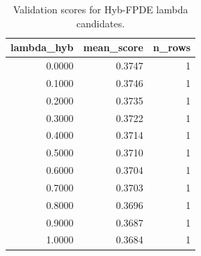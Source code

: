 \begin{table}[t]
\caption{Validation scores for Hyb-FPDE lambda candidates.}
\label{tab:lambda_distribution_computed}
\centering
\begin{tabular}{rrr}
\toprule
lambda\_hyb & mean\_score & n\_rows \\
\midrule
0.0000 & 0.3747 & 1 \\
0.1000 & 0.3746 & 1 \\
0.2000 & 0.3735 & 1 \\
0.3000 & 0.3722 & 1 \\
0.4000 & 0.3714 & 1 \\
0.5000 & 0.3710 & 1 \\
0.6000 & 0.3704 & 1 \\
0.7000 & 0.3703 & 1 \\
0.8000 & 0.3696 & 1 \\
0.9000 & 0.3687 & 1 \\
1.0000 & 0.3684 & 1 \\
\bottomrule
\end{tabular}

\end{table}
